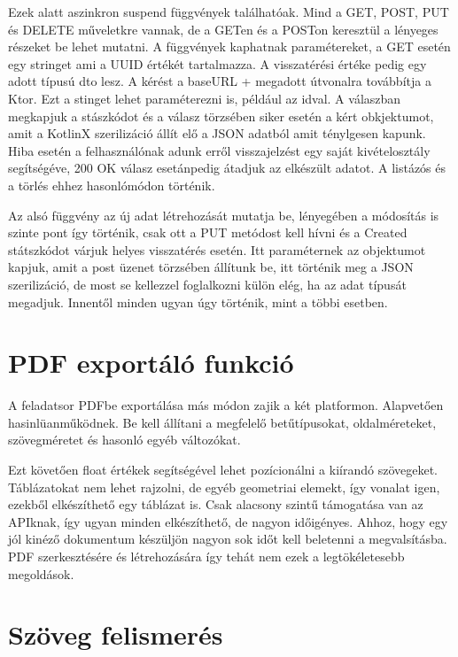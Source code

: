 Ezek alatt aszinkron suspend függvények találhatóak. Mind a GET, POST, PUT és DELETE műveletkre vannak, de a GETen és a POSTon keresztül a lényeges részeket be lehet mutatni.
A függvények kaphatnak paramétereket, a GET esetén egy stringet ami a UUID értékét tartalmazza.
A visszatérési értéke pedig egy adott típusú dto lesz.
A kérést a baseURL + megadott útvonalra továbbítja a Ktor. Ezt a stinget lehet paraméterezni is, például az idval.
A válaszban megkapjuk a stászkódot és a válasz törzsében siker esetén a kért obkjektumot, amit a KotlinX szerilizáció állít elő a JSON adatból amit ténylgesen kapunk.
Hiba esetén a felhasználónak adunk erről visszajelzést egy saját kivételosztály segítségéve, 200 OK válasz esetánpedig átadjuk az elkészült adatot.
A listázós és a törlés ehhez hasonlómódon történik.

Az alsó függvény az új adat létrehozását mutatja be, lényegében a módosítás is szinte pont így történik, csak ott a PUT metódost kell hívni és a Created státszkódot várjuk helyes visszatérés esetén.
Itt paraméternek az objektumot kapjuk, amit a post üzenet törzsében állítunk be, itt történik meg a JSON szerilizáció, de most se kellezzel foglalkozni külön elég, ha az adat típusát megadjuk.
Innentől minden ugyan úgy történik, mint a többi esetben.


\section{PDF exportáló funkció}
\label{sec:PDF}

A feladatsor PDFbe exportálása más módon zajik a két platformon. 
Alapvetően hasinlüanműködnek.
Be kell állítani a megfelelő betűtípusokat, oldalméreteket, szövegméretet és hasonló egyéb változókat.

Ezt követően float értékek segítségével lehet pozícionálni a kiírandó szövegeket.
Táblázatokat nem lehet rajzolni, de egyéb geometriai elemekt, így vonalat igen, ezekből elkészíthető egy táblázat is.
Csak alacsony szintű támogatása van az APIknak, így ugyan minden elkészíthető, de nagyon időigényes.
Ahhoz, hogy egy jól kinéző dokumentum készüljön nagyon sok időt kell beletenni a megvalsításba.
PDF szerkesztésére és létrehozására így tehát nem ezek a legtökéletesebb megoldások.

\section{Szöveg felismerés}
\label{sec:TextRec}

